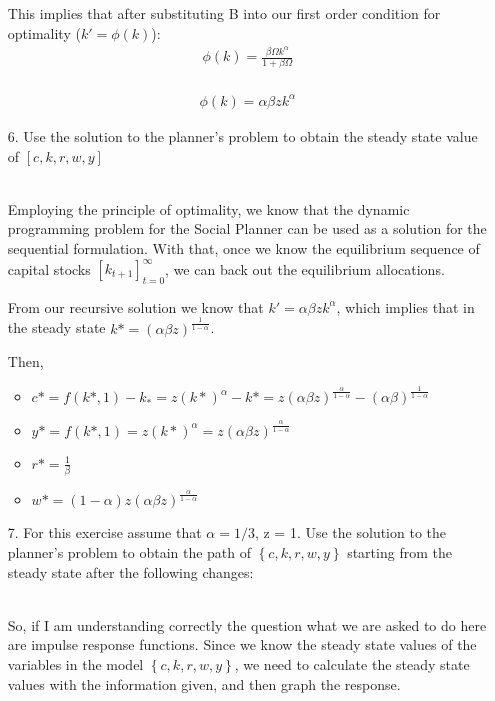 \documentclass[a4paper]{article}
\begin{document}
\begin{enumerate}
This implies that after substituting B into our first order condition for optimality ($k' = \phi(k)$): 
\begin{align*}
\phi(k) = \frac{\beta \Omega k^\alpha}{1+\beta \Omega} \\
\end{align*}

\begin{align}
\phi(k) = \alpha \beta z k^\alpha
\end{align}


\item[6.]Use the solution to the planner’s problem to obtain the steady state value of $\left[c,k,r,w,y\right]$ \\~\

Employing the principle of optimality, we know that the dynamic programming problem for the Social Planner can be used as a solution for the sequential formulation. With that, once we know the equilibrium sequence of capital stocks $\left[ k_{t+1} \right]^{\infty}_{t=0} $, we can back out the equilibrium allocations.

From our recursive solution we know that $k'=\alpha \beta z k^{\alpha}$, which implies that in the steady state $k* = (\alpha \beta z)^{\frac{1}{1-\alpha}}$.



Then, 
\begin{itemize}
\item $c* = f(k*, 1) - k_{*} = z(k*)^{\alpha} - k* = z (\alpha \beta z)^{\frac{\alpha}{1-\alpha}} - (\alpha \beta)^{\frac{1}{1-\alpha}}$
\item $y* = f(k*, 1) = z(k*)^{\alpha} = z(\alpha \beta z)^{\frac{\alpha}{1-\alpha}}$
\item $r* = \frac{1}{\beta}$ 
\item $w* = (1-\alpha)z(\alpha \beta z)^{\frac{\alpha}{1-\alpha}}$
\end{itemize}


\item[7.] For this exercise assume that $\alpha = 1/3$, z = 1. Use the solution to the planner’s problem to obtain the path of $\left\lbrace c, k, r, w, y \right\rbrace$ starting from the steady state after the following changes: \\~\

So, if I am understanding correctly the question what we are asked to do here are impulse response functions. Since we know the steady state values of the variables in the model $\left\lbrace c, k, r, w, y \right\rbrace$, we need to calculate the steady state values with the information given, and then graph the response.  


\end{enumerate}
\end{document}
